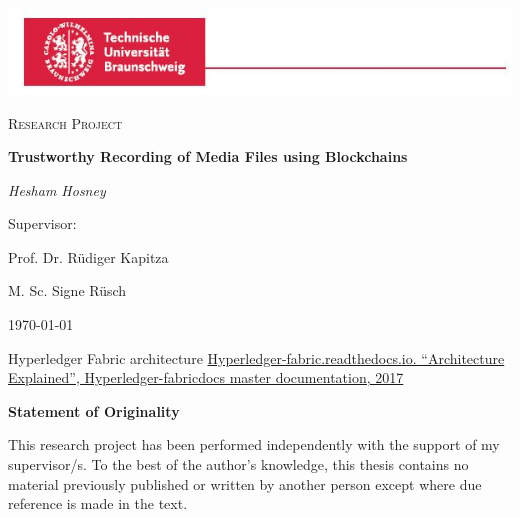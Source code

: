 \documentclass{report}
\begin{document}
\begin{titlepage}
	\centering
	\includegraphics[width=\paperwidth]{images/logo.jpg}\par\vspace{1cm}
	{\scshape\LARGE  \par}
	\vspace{1cm}
	{\scshape\Large Research Project\par}
	\vspace{1.5cm}
	{\huge\bfseries Trustworthy Recording of Media Files using Blockchains \par}
	\vspace{1cm}
	{\huge\itshape Hesham Hosney\par}
        \vspace{2cm} 
	{\Large Supervisor:\par } 
	{\huge Prof. Dr. Rüdiger Kapitza\par}
        \vspace{.5cm} 
        {\huge M. Sc. Signe Rüsch}
	\vfill
	{\large \today\par}
\end{titlepage}


\cleardoublepage

\tableofcontents

\cleardoublepage








\cleardoublepage
\listoffigures
\begin{thebibliography}{9}

Hyperledger Fabric architecture
\url{Hyperledger-fabric.readthedocs.io. “Architecture Explained”, Hyperledger-fabricdocs master documentation, 2017}

\appendix
\end{thebibliography}
\cleardoublepage
\centerline{\bfseries Statement of Originality}
	\vspace*{1em}
	\noindent
	This research project has been performed independently with the support of my supervisor/s.
	To the best of the author's knowledge, this thesis contains no material previously
	published or written by another person except where due reference is made in the text.
\end{document}
